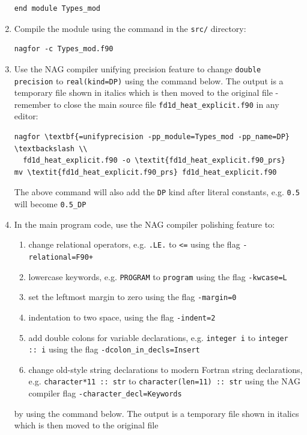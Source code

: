 \documentclass[12pt]{article}
\begin{document}
\begin{enumerate}
\begin{lstlisting}
end module Types_mod
\end{lstlisting}
\item Compile the module using the command in the \texttt{src/} directory:
\begin{Verbatim}[commandchars=\\\{\}]
nagfor -c Types_mod.f90
\end{Verbatim}    
\item Use the NAG compiler unifying precision feature to change \texttt{double precision} to \texttt{real(kind=DP)}
  using the command below. The output is a temporary file shown in italics which is then moved to the original file -
  remember to close the main source file \texttt{fd1d\_heat\_explicit.f90} in any editor:
\begin{Verbatim}[commandchars=\\\{\}]
nagfor \textbf{=unifyprecision -pp_module=Types_mod -pp_name=DP} \textbackslash \\
  fd1d_heat_explicit.f90 -o \textit{fd1d_heat_explicit.f90_prs}
mv \textit{fd1d_heat_explicit.f90_prs} fd1d_heat_explicit.f90
\end{Verbatim}
The above command will also add the \texttt{DP} kind after literal constants, e.g. \texttt{0.5}
will become \texttt{0.5\_DP}
\item In the main program code, use the NAG compiler polishing feature to:
\begin{enumerate}
\item change relational operators, e.g. \texttt{.LE.} to \texttt{<=} using the flag \texttt{-relational=F90+}
\item lowercase keywords, e.g. \texttt{PROGRAM} to \texttt{program} using the flag \texttt{-kwcase=L}
\item set the leftmost margin to zero using the flag \texttt{-margin=0}
\item indentation to two space, using the flag \texttt{-indent=2}
\item add double colons for variable declarations, e.g. \texttt{integer i} to \texttt{integer ::\ i} using the flag
  \texttt{-dcolon\_in\_decls=Insert}
\item change old-style string declarations to modern Fortran string declarations, e.g. \texttt{character*11 ::\ str} to
\texttt{character(len=11) ::\ str} using the NAG compiler flag \texttt{-character\_decl=Keywords}
\end{enumerate}
by using the command below. The output is a temporary file shown in italics which is then moved to the original file

\end{enumerate}
\end{document}
